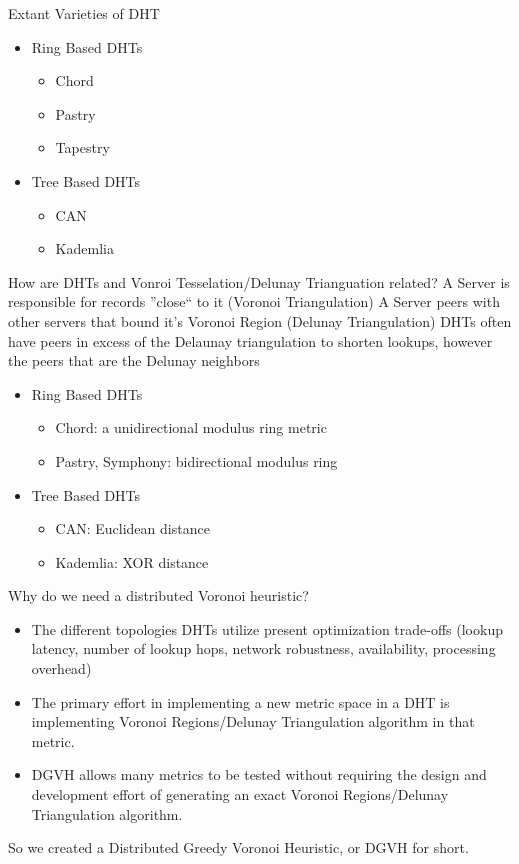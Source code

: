\documentclass[8pt]{beamer}
\begin{document}
\begin{frame}{Extant Varieties of DHT}
	\begin{itemize}
		\item Ring Based DHTs
		\begin{itemize}
			\item Chord
			\item Pastry
			\item Tapestry
		\end{itemize}
		\item Tree Based DHTs
		\begin{itemize}
			\item CAN
			\item Kademlia
		\end{itemize}
	\end{itemize}
\end{frame}

\begin{frame}{How are DHTs and Vonroi Tesselation/Delunay Trianguation related?}
	A Server is responsible for records ''close`` to it (Voronoi Triangulation)
	A Server peers with other servers that bound it's Voronoi Region (Delunay Triangulation)
	DHTs often have peers in excess of the Delaunay triangulation to shorten lookups, however the peers that are the Delunay neighbors
	\begin{itemize}
		\item Ring Based DHTs
		\begin{itemize}
			\item Chord: a unidirectional modulus ring metric
			\item Pastry, Symphony: bidirectional modulus ring
		\end{itemize}
		\item Tree Based DHTs
		\begin{itemize}
			\item CAN: Euclidean distance
			\item Kademlia: XOR distance
		\end{itemize}
	\end{itemize}
\end{frame}


\begin{frame}{Why do we need a distributed Voronoi heuristic?}
	\begin{itemize}
		\item The different topologies DHTs utilize present optimization trade-offs (lookup latency, number of lookup hops, network robustness, availability, processing overhead)
		\item The primary effort in implementing a new metric space in a DHT is implementing Voronoi Regions/Delunay Triangulation algorithm in that metric.
		\item DGVH allows many metrics to be tested without requiring the design and development effort of generating an exact Voronoi Regions/Delunay Triangulation algorithm.
	\end{itemize}
	
	So we created a Distributed Greedy Voronoi Heuristic, or DGVH for short.
\end{frame}
\end{document}
